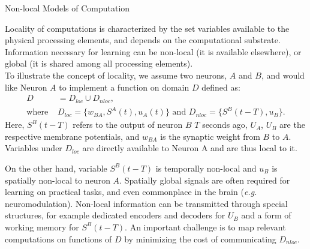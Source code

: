 \documentclass[journal,onecolumn,11pt]{IEEEtran}
\begin{document}
\begin{infobox}
  \begin{mdframed}[backgroundcolor=black!10]\small
    \caption{\label{box:nonlocal} Non-local Models of Computation}
     Locality of computations is characterized by the set variables available to the physical processing elements, and depends on the computational substrate.
    Information necessary for learning can be non-local (it is available elsewhere), or global (it is shared among all processing elements).\\
    To illustrate the concept of locality, we assume two neurons, $A$ and $B$, and would like Neuron $A$ to implement a function on domain $D$ defined as:
    \[ 
      \begin{split}
        D & = D_{loc} \cup D_{nloc},\\
        \text{where } &D_{loc}=\{w_{BA},S^A(t), u_A(t)\}\text{ and }D_{nloc} = \{ S^B(t-T), u_{B}\}.
      \end{split}
    \]
    Here, $S^B(t-T)$ refers to the output of neuron $B$ $T$ seconds ago, $U_A$, $U_B$ are the respective membrane potentials, and $w_{BA}$ is the synaptic weight from $B$ to $A$.  
    Variables under $D_{loc}$ are directly available to Neuron A and are thus local to it. 
      
    On the other hand, variable $S^B(t-T)$ is temporally non-local and $u_{B}$ is spatially non-local to neuron $A$.
    Spatially global signals are often required for learning on practical tasks, and even commonplace in the brain (\emph{e.g.} neuromodulation).
    Non-local information can be transmitted through special structures, for example dedicated encoders and decoders for $U_B$ and a form of working memory for $S^B(t-T)$.
    An important challenge is to map relevant computations on functions of $D$ by minimizing the cost of communicating $D_{nloc}$.
    
  \end{mdframed}
\end{infobox}
\end{document}
